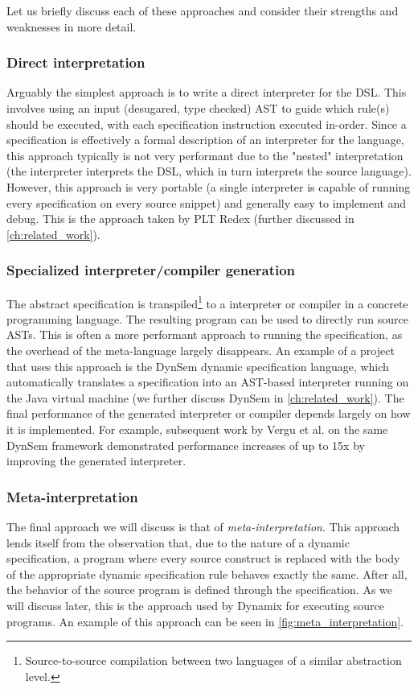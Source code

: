 \noindent Let us briefly discuss each of these approaches and consider their strengths and weaknesses in more detail. 

\subsubsection*{Direct interpretation} Arguably the simplest approach is to write a direct interpreter for the \ac{DSL}. This involves using an input (desugared, type checked) \ac{AST} to guide which rule(s) should be executed, with each specification instruction executed in-order. Since a specification is effectively a formal description of an interpreter for the language, this approach typically is not very performant due to the "nested" interpretation (the interpreter interprets the \ac{DSL}, which in turn interprets the source language). However, this approach is very portable (a single interpreter is capable of running every specification on every source snippet) and generally easy to implement and debug. This is the approach taken by PLT Redex \cite{MatthewsFFF04}  (further discussed in \cref{ch:related_work}).

\subsubsection*{Specialized interpreter/compiler generation} The abstract specification is transpiled\footnote{Source-to-source compilation between two languages of a similar abstraction level.} to a interpreter or compiler in a concrete programming language. The resulting program can be used to directly run source ASTs. This is often a more performant approach to running the specification, as the overhead of the meta-language largely disappears. An example of a project that uses this approach is the DynSem \cite{VerguNV15} dynamic specification language, which automatically translates a specification into an AST-based interpreter running on the Java virtual machine (we further discuss DynSem in \cref{ch:related_work}). The final performance of the generated interpreter or compiler depends largely on how it is implemented. For example, subsequent work by Vergu et al. \cite{VerguV18} on the same DynSem framework demonstrated performance increases of up to 15x by improving the generated interpreter.

\subsubsection*{Meta-interpretation} The final approach we will discuss is that of \textit{meta-interpretation}. This approach lends itself from the observation that, due to the nature of a dynamic specification, a program where every source construct is replaced with the body of the appropriate dynamic specification rule behaves exactly the same. After all, the behavior of the source program is defined through the specification. As we will discuss later, this is the approach used by Dynamix for executing source programs. An example of this approach can be seen in \cref{fig:meta_interpretation}.

